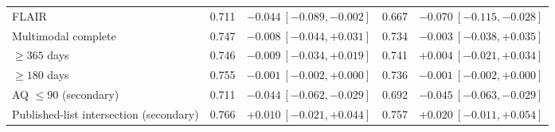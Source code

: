 \begin{table}[!t]
\begin{tabular}{lrrrr}
FLAIR & 0.711 & $-0.044\ [-0.089,-0.002]$ & 0.667 & $-0.070\ [-0.115,-0.028]$ \\
Multimodal complete & 0.747 & $-0.008\ [-0.044,+0.031]$ & 0.734 & $-0.003\ [-0.038,+0.035]$ \\
$\ge365$ days & 0.746 & $-0.009\ [-0.034,+0.019]$ & 0.741 & $+0.004\ [-0.021,+0.034]$ \\
$\ge180$ days & 0.755 & $-0.001\ [-0.002,+0.000]$ & 0.736 & $-0.001\ [-0.002,+0.000]$ \\
AQ $\le90$ (secondary) & 0.711 & $-0.044\ [-0.062,-0.029]$ & 0.692 & $-0.045\ [-0.063,-0.029]$ \\
Published-list intersection (secondary) & 0.766 & $+0.010\ [-0.021,+0.044]$ & 0.757 & $+0.020\ [-0.011,+0.054]$ \\
\bottomrule
\end{tabular}
\end{table}

